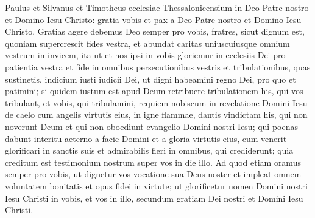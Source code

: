 \begin{biblechapter}
 \verse Paulus et Silvanus et Timotheus ecclesiae Thessalonicensium in Deo Patre nostro et Domino Iesu Christo: 
\verse gratia vobis et pax a Deo Patre nostro et Domino Iesu Christo.
 \verse Gratias agere debemus Deo semper pro vobis, fratres, sicut dignum est, quoniam supercrescit fides vestra, et abundat caritas uniuscuiusque omnium vestrum in invicem, 
\verse ita ut et nos ipsi in vobis gloriemur in ecclesiis Dei pro patientia vestra et fide in omnibus persecutionibus vestris et tribulationibus, quas sustinetis, 
\verse indicium iusti iudicii Dei, ut digni habeamini regno Dei, pro quo et patimini; 
\verse si quidem iustum est apud Deum retribuere tribulationem his, qui vos tribulant, 
\verse et vobis, qui tribulamini, requiem nobiscum in revelatione Domini Iesu de caelo cum angelis virtutis eius, 
\verse in igne flammae, dantis vindictam his, qui non noverunt Deum et qui non oboediunt evangelio Domini nostri Iesu; 
\verse qui poenas dabunt interitu aeterno a facie Domini et a gloria virtutis eius, 
 \verse cum venerit glorificari in sanctis suis et admirabilis fieri in omnibus, qui crediderunt; quia creditum est testimonium nostrum super vos in die illo.
 \verse Ad quod etiam oramus semper pro vobis, ut dignetur vos vocatione sua Deus noster et impleat omnem voluntatem bonitatis et opus fidei in virtute; 
 \verse ut glorificetur nomen Domini nostri Iesu Christi in vobis, et vos in illo, secundum gratiam Dei nostri et Domini Iesu Christi.
 

\end{biblechapter}
